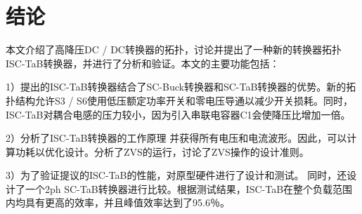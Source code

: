 \documentclass[12pt,a4paper]{report}
\begin{document}
\chapter{结论}

本文介绍了高降压DC / DC转换器的拓扑，讨论并提出了一种新的转换器拓扑ISC-TaB转换器，并进行了分析和验证。本文的主要功能包括：

1）提出的ISC-TaB转换器结合了SC-Buck转换器和SC-TaB转换器的优势。新的拓扑结构允许S3 / S6使用低压额定功率开关和零电压导通以减少开关损耗。同时，ISC-TaB对耦合电感的压力较小，因为引入串联电容器C1会使降压比增加一倍。

2）分析了ISC-TaB转换器的工作原理
并获得所有电压和电流波形。因此，可以计算功耗以优化设计。分析了ZVS的运行，讨论了ZVS操作的设计准则。

3）为了验证提议的ISC-TaB的性能，对原型硬件进行了设计和测试。
同时，还设计了一个2ph SC-TaB转换器进行比较。根据测试结果，ISC-TaB在整个负载范围内均具有更高的效率，并且峰值效率达到了95.6％。
\end{document}
